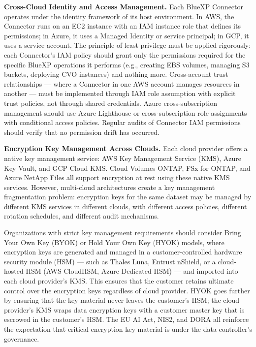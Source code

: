 \begin{securitybox}

\textbf{Cross-Cloud Identity and Access Management.}
Each BlueXP Connector operates under the identity framework of its host environment. In AWS, the Connector runs on an EC2 instance with an IAM instance role that defines its permissions; in Azure, it uses a Managed Identity or service principal; in GCP, it uses a service account. The principle of least privilege must be applied rigorously: each Connector's IAM policy should grant only the permissions required for the specific BlueXP operations it performs (e.g., creating EBS volumes, managing S3 buckets, deploying CVO instances) and nothing more. Cross-account trust relationships --- where a Connector in one AWS account manages resources in another --- must be implemented through IAM role assumption with explicit trust policies, not through shared credentials. Azure cross-subscription management should use Azure Lighthouse or cross-subscription role assignments with conditional access policies. Regular audits of Connector IAM permissions should verify that no permission drift has occurred.

\textbf{Encryption Key Management Across Clouds.}
Each cloud provider offers a native key management service: AWS Key Management Service (KMS), Azure Key Vault, and GCP Cloud KMS. Cloud Volumes ONTAP, FSx for ONTAP, and Azure NetApp Files all support encryption at rest using these native KMS services. However, multi-cloud architectures create a key management fragmentation problem: encryption keys for the same dataset may be managed by different KMS services in different clouds, with different access policies, different rotation schedules, and different audit mechanisms.

Organizations with strict key management requirements should consider Bring Your Own Key (BYOK) or Hold Your Own Key (HYOK) models, where encryption keys are generated and managed in a customer-controlled hardware security module (HSM) --- such as Thales Luna, Entrust nShield, or a cloud-hosted HSM (AWS CloudHSM, Azure Dedicated HSM) --- and imported into each cloud provider's KMS. This ensures that the customer retains ultimate control over the encryption keys regardless of cloud provider. HYOK goes further by ensuring that the key material never leaves the customer's HSM; the cloud provider's KMS wraps data encryption keys with a customer master key that is escrowed in the customer's HSM. The EU AI Act, NIS2, and DORA all reinforce the expectation that critical encryption key material is under the data controller's governance.


\end{securitybox}
